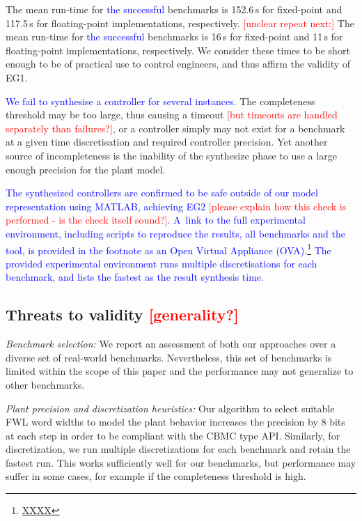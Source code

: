 \documentclass[twocolumn]{autart}    %
\renewcommand{\note}[1]{\textcolor{red}{[#1]}}
\begin{document}
The mean run-time for \textcolor{blue}{the successful} benchmarks is 152.6\,s for fixed-point and 117.5\,s for floating-point implementations, respectively.  
\note{unclear repeat next:} The mean run-time for \textcolor{blue}{the successful} benchmarks is 16\,s for fixed-point and 11\,s for floating-point implementations, respectively.
We consider these times to be short enough to be of practical use to control engineers, and thus affirm the validity of EG1.

\textcolor{blue}{We fail to synthesise a controller for several instances.}  
The completeness threshold may be too large, thus causing a timeout \note{but timeouts are handled separately than failures?}, 
or a controller simply may not exist for a benchmark at a given time discretisation and required controller precision. 
Yet another source of incompleteness is the inability of the {\sc synthesize} phase to use a large enough precision for the plant model. 

\textcolor{blue}{The synthesized controllers are confirmed to be safe outside of our model
representation using MATLAB, achieving EG2 \note{please explain how this check is performed - is the check itself sound?}.  
A~link to the full experimental environment, including scripts to reproduce the results, all
benchmarks and the tool, is provided in the
footnote as an Open Virtual Appliance (OVA).\footnote{\url{XXXX}}
The provided experimental environment runs multiple discretisations for each
benchmark, and lists the fastest as the result synthesis time.}

\subsection{Threats to validity \note{generality?}}
\label{exp:threats-to-validity}

\textit{Benchmark selection:} We report an assessment of both our approaches
over a diverse set of real-world benchmarks.  Nevertheless, this set of
benchmarks is limited within the scope of this paper and the performance may
not generalize to other benchmarks.

\textit{Plant precision and discretization heuristics:} Our algorithm to
select suitable FWL word widths to model the plant behavior 
increases the precision by 8 bits at each step 
in order to be compliant with the CBMC type API. 
Similarly, for discretization, we run multiple discretizations for each
benchmark and retain the fastest run.
This works sufficiently well for our benchmarks, but
performance may suffer in some cases, for example if the completeness
threshold is high. 
\end{document}
